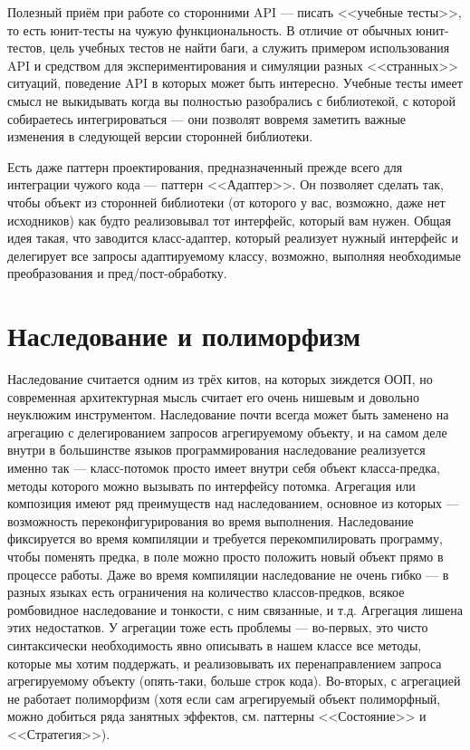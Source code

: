 \documentclass[a5paper]{article}
\begin{document}
Полезный приём при работе со сторонними API --- писать <<учебные тесты>>, то есть юнит-тесты на чужую функциональность. В отличие от обычных юнит-тестов, цель учебных тестов не найти баги, а служить примером использования API и средством для экспериментирования и симуляции разных <<странных>> ситуаций, поведение API в которых может быть интересно. Учебные тесты имеет смысл не выкидывать когда вы полностью разобрались с библиотекой, с которой собираетесь интегрироваться --- они позволят вовремя заметить важные изменения в следующей версии сторонней библиотеки.

Есть даже паттерн проектирования, предназначенный прежде всего для интеграции чужого кода --- паттерн <<Адаптер>>. Он позволяет сделать так, чтобы объект из сторонней библиотеки (от которого у вас, возможно, даже нет исходников) как будто реализовывал тот интерфейс, который вам нужен. Общая идея такая, что заводится класс-адаптер, который реализует нужный интерфейс и делегирует все запросы адаптируемому классу, возможно, выполняя необходимые преобразования и пред/пост-обработку.

\section{Наследование и полиморфизм}

Наследование считается одним из трёх китов, на которых зиждется ООП, но современная архитектурная мысль считает его очень нишевым и довольно неуклюжим инструментом. Наследование почти всегда может быть заменено на агрегацию с делегированием запросов агрегируемому объекту, и на самом деле внутри в большинстве языков программирования наследование реализуется именно так --- класс-потомок просто имеет внутри себя объект класса-предка, методы которого можно вызывать по интерфейсу потомка. Агрегация или композиция имеют ряд преимуществ над наследованием, основное из которых --- возможность переконфигурирования во время выполнения. Наследование фиксируется во время компиляции и требуется перекомпилировать программу, чтобы поменять предка, в поле можно просто положить новый объект прямо в процессе работы. Даже во время компиляции наследование не очень гибко --- в разных языках есть ограничения на количество классов-предков, всякое ромбовидное наследование и тонкости, с ним связанные, и т.д. Агрегация лишена этих недостатков. У агрегации тоже есть проблемы --- во-первых, это чисто синтаксически необходимость явно описывать в нашем классе все методы, которые мы хотим поддержать, и реализовывать их перенаправлением запроса агрегируемому объекту (опять-таки, больше строк кода). Во-вторых, с агрегацией не работает полиморфизм (хотя если сам агрегируемый объект полиморфный, можно добиться ряда занятных эффектов, см. паттерны <<Состояние>> и <<Стратегия>>).
\end{document}
